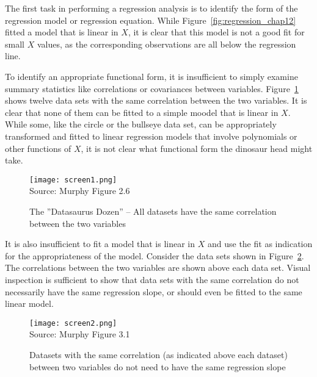 The first task in performing a regression analysis is to identify the form of the regression model or regression equation. While Figure~\ref{fig:regression_chap12} fitted a model that is linear in $X$, it is clear that this model is not a good fit for small $X$ values, as the corresponding observations are all below the regression line. 

To identify an appropriate functional form, it is insufficient to simply examine summary statistics like correlations or covariances between variables. Figure~\ref{fig:datasaurus} shows twelve data sets with the same correlation between the two variables. It is clear that none of them can be fitted to a simple moodel that is linear in $X$. While some, like the circle or the bullseye data set, can be appropriately transformed and fitted to linear regression models that involve polynomials or other functions of $X$, it is not clear what functional form the dinosaur head might take.

\begin{figure}
\centering
\texttt{[image: screen1.png]} \\

\scriptsize Source: Murphy Figure 2.6 \\ \vspace{3mm}
\normalsize
\caption[The ''Datasaurus Dozen'' data sets]{The ''Datasaurus Dozen'' -- All datasets have the same correlation between the two variables}
\label{fig:datasaurus}
\end{figure}

It is also insufficient to fit a model that is linear in $X$ and use the fit as indication for the appropriateness of the model. Consider the data sets shown in Figure~\ref{fig:murphy31}. The correlations between the two variables are shown above each data set. Visual inspection is sufficient to show that data sets with the same correlation do not necessarily have the same regression slope, or should even be fitted to the same linear model. 

\begin{figure}
\centering
\texttt{[image: screen2.png]} \\

\scriptsize Source: Murphy Figure 3.1 \\ \vspace{3mm}
\normalsize
\caption[Correlation and regression slopes]{Datasets with the same correlation (as indicated above each dataset) between two variables do not need to have the same regression slope}
\label{fig:murphy31}
\end{figure}


